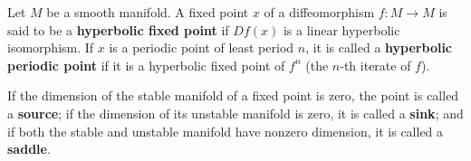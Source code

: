 \documentclass[12pt]{article}
\begin{document}
Let $M$ be a smooth manifold. A fixed point $x$ of a diffeomorphism 
$f\colon M\to M$ is said to be a \textbf{hyperbolic fixed point} if $Df(x)$ is a linear hyperbolic isomorphism. If $x$ is a periodic point of least period $n$, it is called a \textbf{hyperbolic periodic point} if it is a hyperbolic fixed point of $f^n$ (the $n$-th iterate of $f$).

If the dimension of the stable manifold of a fixed point is zero, the point is called a \textbf{source}; if the dimension of its unstable manifold is zero, it is called a \textbf{sink}; and if both the stable and unstable manifold have nonzero dimension, it is called a \textbf{saddle}.
\end{document}
